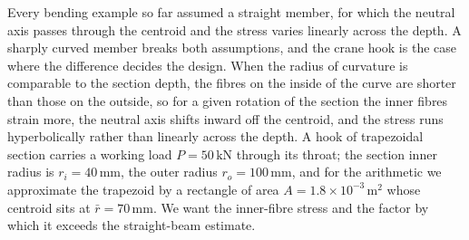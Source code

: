 Every bending example so far assumed a straight member, for which the
neutral axis passes through the centroid and the stress varies linearly
across the depth. A sharply curved member breaks both assumptions, and
the crane hook is the case where the difference decides the design. When
the radius of curvature is comparable to the section depth, the fibres on
the inside of the curve are shorter than those on the outside, so for a
given rotation of the section the inner fibres strain more, the neutral
axis shifts inward off the centroid, and the stress runs hyperbolically
rather than linearly across the depth. A hook of trapezoidal section
carries a working load $P = 50\,\text{kN}$ through its throat; the section
inner radius is $r_i = 40\,\si{\milli\meter}$, the outer radius $r_o =
100\,\si{\milli\meter}$, and for the arithmetic we approximate the
trapezoid by a rectangle of area $A = 1.8\times 10^{-3}\,\si{\meter}^2$
whose centroid sits at $\bar{r} = 70\,\si{\milli\meter}$. We want the
inner-fibre stress and the factor by which it exceeds the straight-beam
estimate.

